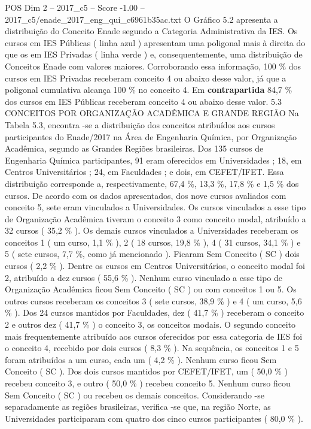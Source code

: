 \begin{textsample}{POS Dim 2 – 2017\_c5 – Score -1.00 – 2017\_c5/enade\_2017\_eng\_qui\_c6961b35ac.txt}
O Gráfico 5.2 apresenta a distribuição do Conceito Enade segundo a Categoria Administrativa da IES.
Os cursos em IES Públicas ( linha azul ) apresentam uma poligonal mais à direita do que os em IES Privadas ( linha verde ) e, consequentemente, uma distribuição de Conceitos Enade com valores maiores.
Corroborando essa informação, 100 \% dos cursos em IES Privadas receberam conceito 4 ou abaixo desse valor, já que a poligonal cumulativa alcança 100 \% no conceito 4.
Em \textbf{contrapartida} 84,7 \% dos cursos em IES Públicas receberam conceito 4 ou abaixo desse valor. 5.3 CONCEITOS POR ORGANIZAÇÃO ACADÊMICA E GRANDE REGIÃO Na Tabela 5.3, encontra -se a distribuição dos conceitos atribuídos aos cursos participantes do Enade/2017 na Área de Engenharia Química, por Organização Acadêmica, segundo as Grandes Regiões brasileiras.
Dos 135 cursos de Engenharia Química participantes, 91 eram oferecidos em Universidades ; 18, em Centros Universitários ; 24, em Faculdades ; e dois, em CEFET/IFET.
Essa distribuição corresponde a, respectivamente, 67,4 \%, 13,3 \%, 17,8 \% e 1,5 \% dos cursos.
De acordo com os dados apresentados, dos nove cursos avaliados com conceito 5, sete eram vinculados a Universidades.
Os cursos vinculados a esse tipo de Organização Acadêmica tiveram o conceito 3 como conceito modal, atribuído a 32 cursos ( 35,2 \% ).
Os demais cursos vinculados a Universidades receberam os conceitos 1 ( um curso, 1,1 \% ), 2 ( 18 cursos, 19,8 \% ), 4 ( 31 cursos, 34,1 \% ) e 5 ( sete cursos, 7,7 \%, como já mencionado ).
Ficaram Sem Conceito ( SC ) dois cursos ( 2,2 \% ).
Dentre os cursos em Centros Universitários, o conceito modal foi 2, atribuído a dez cursos ( 55,6 \% ).
Nenhum curso vinculado a esse tipo de Organização Acadêmica ficou Sem Conceito ( SC ) ou com conceitos 1 ou 5.
Os outros cursos receberam os conceitos 3 ( sete cursos, 38,9 \% ) e 4 ( um curso, 5,6 \% ).
Dos 24 cursos mantidos por Faculdades, dez ( 41,7 \% ) receberam o conceito 2 e outros dez ( 41,7 \% ) o conceito 3, os conceitos modais.
O segundo conceito mais frequentemente atribuído aos cursos oferecidos por essa categoria de IES foi o conceito 4, recebido por dois cursos ( 8,3 \% ).
Na sequência, os conceitos 1 e 5 foram atribuídos a um curso, cada um ( 4,2 \% ).
Nenhum curso ficou Sem Conceito ( SC ).
Dos dois cursos mantidos por CEFET/IFET, um ( 50,0 \% ) recebeu conceito 3, e outro ( 50,0 \% ) recebeu conceito 5.
Nenhum curso ficou Sem Conceito ( SC ) ou recebeu os demais conceitos.
Considerando -se separadamente as regiões brasileiras, verifica -se que, na região Norte, as Universidades participaram com quatro dos cinco cursos participantes ( 80,0 \% ).

\end{textsample}
